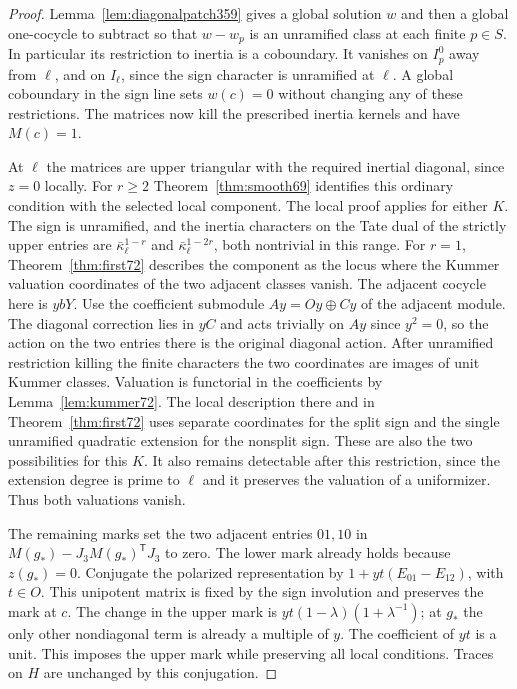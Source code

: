 \documentclass[a4paper,11pt]{article}
\theoremstyle{definition}
\theoremstyle{remark}
\numberwithin{equation}{section}
\begin{document}
\begin{proof}
Lemma~\ref{lem:diagonalpatch359} gives a global solution \(w\)
and then a global one-cocycle to subtract so that \(w-w_p\)
is an unramified class at each finite \(p\in S\). In particular
its restriction to inertia is a coboundary. It vanishes on
\(I_p^0\) away from \(\ell\), and on \(I_\ell\), since the
sign character is unramified at \(\ell\). A global coboundary
in the sign line sets \(w(c)=0\) without changing any of these
restrictions. The matrices now kill the prescribed inertia
kernels and have \(M(c)=1\).

At \(\ell\) the matrices are upper triangular with the required
inertial diagonal, since \(z=0\) locally. For \(r\ge2\)
Theorem~\ref{thm:smooth69} identifies this ordinary condition
with the selected local component. The local proof applies for
either \(K\). The sign is unramified, and the inertia characters
on the Tate dual of the strictly upper entries are
\(\bar\kappa_\ell^{1-r}\) and \(\bar\kappa_\ell^{1-2r}\), both
nontrivial in this range. For \(r=1\),
Theorem~\ref{thm:first72} describes the component as the locus
where the Kummer valuation coordinates of the two adjacent
classes vanish. The adjacent cocycle here is \(y bY\).
Use the coefficient submodule \(Ay=Oy\oplus Cy\) of the
adjacent module. The diagonal correction lies in \(yC\) and
acts trivially on \(Ay\) since \(y^2=0\), so the action on the
two entries there is the original diagonal action.
After unramified restriction killing the finite characters the
two coordinates are images of unit Kummer classes. Valuation is
functorial in the coefficients by Lemma~\ref{lem:kummer72}.
The local description there and in Theorem~\ref{thm:first72}
uses separate coordinates for the split sign and the single
unramified quadratic extension for the nonsplit sign. These
are also the two possibilities for this \(K\).
It also remains detectable after this restriction, since the
extension degree is prime to \(\ell\) and it preserves the
valuation of a uniformizer. Thus both valuations vanish.

The remaining marks set the two adjacent entries \(01,10\) in
\(M(g_*)-J_3M(g_*)^{\mathsf T}J_3\) to zero. The lower mark
already holds because \(z(g_*)=0\). Conjugate the polarized
representation by \(1+yt(E_{01}-E_{12})\), with \(t\in O\).
This unipotent matrix is fixed by the sign involution and
preserves the mark at \(c\). The change in the upper mark is
\(yt(1-\lambda)(1+\lambda^{-1})\); at \(g_*\) the only other
nondiagonal term is already a multiple of \(y\). The coefficient
of \(yt\) is a unit. This imposes the upper mark while preserving
all local conditions. Traces on \(H\) are unchanged by this
conjugation.


\end{proof}
\end{document}
